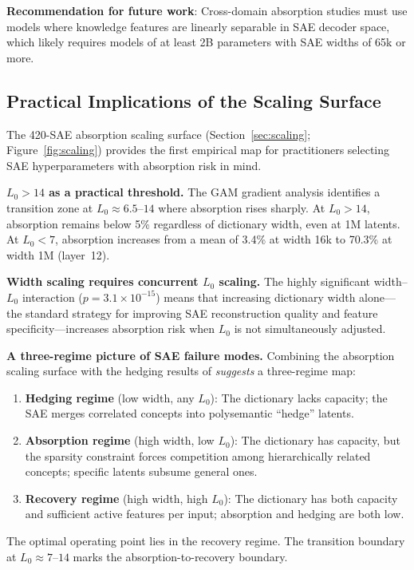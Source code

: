 \documentclass{article}
\begin{document}
\textbf{Recommendation for future work}: Cross-domain absorption studies must use models where knowledge features are linearly separable in SAE decoder space, which likely requires models of at least 2B parameters with SAE widths of 65k or more.

\subsection{Practical Implications of the Scaling Surface}

The 420-SAE absorption scaling surface (Section~\ref{sec:scaling}; Figure~\ref{fig:scaling}) provides the first empirical map for practitioners selecting SAE hyperparameters with absorption risk in mind.

\textbf{$L_0 > 14$ as a practical threshold.}
The GAM gradient analysis identifies a transition zone at $L_0 \approx 6.5$--$14$ where absorption rises sharply.
At $L_0 > 14$, absorption remains below 5\% regardless of dictionary width, even at 1M latents.
At $L_0 < 7$, absorption increases from a mean of 3.4\% at width 16k to 70.3\% at width 1M (layer~12).

\textbf{Width scaling requires concurrent $L_0$ scaling.}
The highly significant width--$L_0$ interaction ($p = 3.1 \times 10^{-15}$) means that increasing dictionary width alone---the standard strategy for improving SAE reconstruction quality and feature specificity---increases absorption risk when $L_0$ is not simultaneously adjusted.

\textbf{A three-regime picture of SAE failure modes.}
Combining the absorption scaling surface with the hedging results of \citet{chanin2025hedging} \emph{suggests} a three-regime map:
\begin{enumerate}
\item \textbf{Hedging regime} (low width, any $L_0$): The dictionary lacks capacity; the SAE merges correlated concepts into polysemantic ``hedge'' latents.
\item \textbf{Absorption regime} (high width, low $L_0$): The dictionary has capacity, but the sparsity constraint forces competition among hierarchically related concepts; specific latents subsume general ones.
\item \textbf{Recovery regime} (high width, high $L_0$): The dictionary has both capacity and sufficient active features per input; absorption and hedging are both low.
\end{enumerate}

The optimal operating point lies in the recovery regime.
The transition boundary at $L_0 \approx 7$--$14$ marks the absorption-to-recovery boundary.
\end{document}
